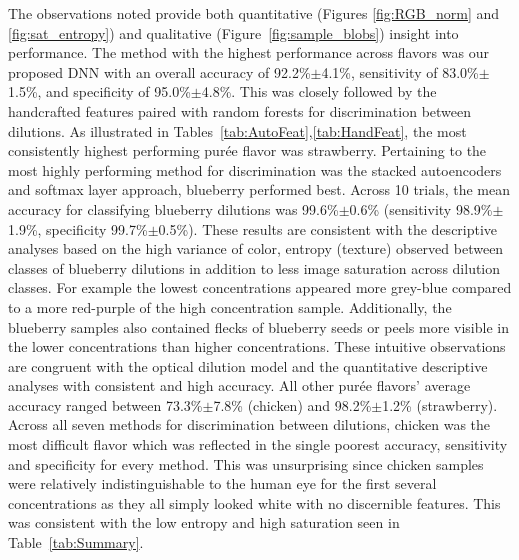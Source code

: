 \documentclass[authoryear]{elsarticle}
\begin{document}
The observations noted provide both quantitative (Figures \ref{fig:RGB_norm} and \ref{fig:sat_entropy}) and qualitative (Figure~\ref{fig:sample_blobs}) insight into performance. The method with the highest performance across flavors was our proposed DNN with an overall accuracy of 92.2\%$\pm$4.1\%, sensitivity of 83.0\%$\pm$1.5\%, and specificity of 95.0\%$\pm$4.8\%. This was closely followed by the handcrafted features paired with random forests for discrimination between dilutions. As illustrated in Tables~\ref{tab:AutoFeat},\ref{tab:HandFeat}, the most consistently highest performing pur\' ee flavor was strawberry. Pertaining to the most highly performing method for discrimination was the stacked autoencoders and softmax layer approach, blueberry performed best. Across 10 trials, the mean accuracy for classifying blueberry dilutions was 99.6\%$\pm$0.6\% (sensitivity 98.9\%$\pm$1.9\%, specificity 99.7\%$\pm$0.5\%). These results are consistent with the descriptive analyses based on the high variance  of color, entropy (texture) observed between classes of blueberry dilutions in addition to less image saturation across dilution classes. For example the lowest concentrations appeared more grey-blue compared to a more red-purple of the high concentration sample. Additionally, the blueberry samples also contained flecks of blueberry seeds or peels more visible in the lower concentrations than higher concentrations. These intuitive observations are congruent with the optical dilution model and the quantitative descriptive analyses with consistent and high accuracy. All other pur\' ee flavors' average accuracy ranged between 73.3\%$\pm$7.8\% (chicken) and 98.2\%$\pm$1.2\% (strawberry). Across all seven methods for discrimination between dilutions, chicken was the most difficult flavor which was reflected in the single poorest accuracy, sensitivity and specificity for every method. This was unsurprising since chicken samples were relatively indistinguishable to the human eye for the first several concentrations as they all simply looked white with no discernible features. This was consistent with the low entropy and high saturation seen in Table~\ref{tab:Summary}.
\end{document}

